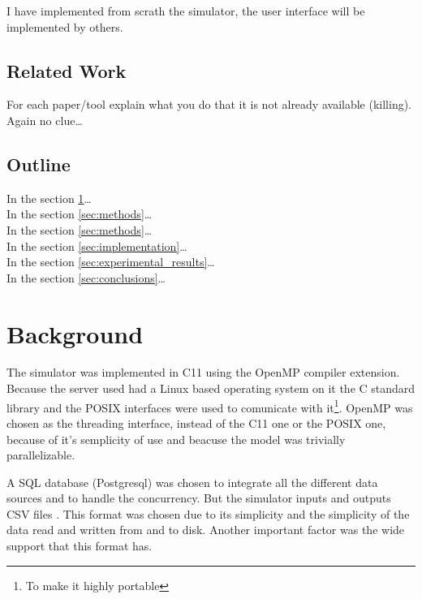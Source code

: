\documentclass[draft]{article}
\begin{document}
I have implemented from scrath the simulator, the user interface will be
implemented by others.

\subsection{Related Work}\label{sec:related_work}

For each paper/tool explain what you do that it is not already available
(killing). Again no clue\dots

\subsection{Outline}\label{sec:outline}

In the section \ref{sec:background}\dots\\
In the section \ref{sec:methods}\dots\\
In the section \ref{sec:methods}\dots\\
In the section \ref{sec:implementation}\dots\\
In the section \ref{sec:experimental_results}\dots\\
In the section \ref{sec:conclusions}\dots\\

\section{Background}\label{sec:background}

The simulator was implemented in C11 using the OpenMP compiler extension.
Because the server used had a Linux based operating system on it the C standard
library and the POSIX interfaces were used to comunicate with it\footnote{To
make it highly portable}. OpenMP was chosen as the threading interface, instead
of the C11 one or the POSIX one, because of it's semplicity of use and beacuse
the model was trivially parallelizable.

A SQL database (Postgresql) was chosen to integrate all the different data
sources and to handle the concurrency. But the simulator inputs and outputs CSV
files \cite{csv}. This format was chosen due to its simplicity and the
simplicity of the data read and written from and to disk. Another important
factor was the wide support that this format has.
\end{document}
